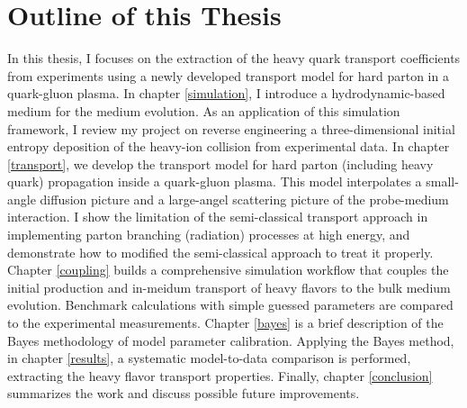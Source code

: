 \section{Outline of this Thesis}
In this thesis, I focuses on the extraction of the heavy quark transport coefficients from experiments using a newly developed transport model for hard parton in a quark-gluon plasma.
In chapter \ref{simulation}, I introduce a hydrodynamic-based medium for the medium evolution. 
As an application of this simulation framework, I review my project on reverse engineering a three-dimensional initial entropy deposition of the heavy-ion collision from experimental data. 
In chapter \ref{transport}, we develop the transport model for hard parton (including heavy quark)  propagation inside a quark-gluon plasma.
This model interpolates a small-angle diffusion picture and a large-angel scattering picture of the probe-medium interaction.
I show the limitation of the semi-classical transport approach in implementing parton branching (radiation) processes at high energy, and demonstrate how to modified the semi-classical approach to treat it properly.
Chapter \ref{coupling} builds a comprehensive simulation workflow that couples the initial production and in-meidum transport of heavy flavors to the bulk medium evolution.
Benchmark calculations with simple guessed parameters are compared to the experimental measurements.
Chapter \ref{bayes} is a brief description of the Bayes methodology of model parameter calibration.
Applying the Bayes method, in chapter \ref{results}, a systematic model-to-data comparison is performed, extracting the heavy flavor transport properties.
Finally, chapter \ref{conclusion} summarizes the work and discuss possible future improvements.


